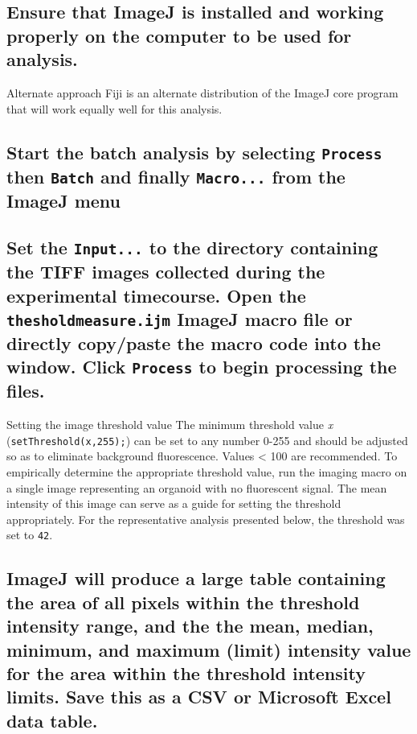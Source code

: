 \documentclass[11pt]{article}
\begin{document}
\subsection{{\sffamily } Ensure that ImageJ \supercite{Schneider:2012} is installed and working properly on the computer to be used for analysis.}
\label{sec:orgheadline84}

\begin{bclogo}[logo=\bcinfo, couleurBarre=Black, noborder=true, couleur=gray!10]{     Alternate approach}
Fiji \supercite{Schindelin:2012} is an alternate distribution of the ImageJ core program that will work equally well for this analysis.\\
\end{bclogo}

\subsection{{\sffamily } Start the batch analysis by selecting \texttt{Process} then \texttt{Batch} and finally \texttt{Macro...} from the ImageJ menu}
\label{sec:orgheadline85}
\subsection{{\sffamily } Set the \texttt{Input...} to the directory containing the TIFF images collected during the experimental timecourse. Open the \texttt{thesholdmeasure.ijm} ImageJ macro file or directly copy/paste the macro code into the window. Click \texttt{Process} to begin processing the files.}
\label{sec:orgheadline86}
\begin{bclogo}[logo=\bcinfo, couleurBarre=Black, noborder=true, couleur=gray!10]{     Setting the image threshold value}
The minimum threshold value \emph{x} (\texttt{setThreshold(x,255);}) can be set to any number 0-255 and should be adjusted so as to eliminate background fluorescence. Values < 100 are recommended. To empirically determine the appropriate threshold value, run the imaging macro on a single image representing an organoid with no fluorescent signal. The mean intensity of this image can serve as a guide for setting the threshold appropriately. For the representative analysis presented below, the threshold was set to \texttt{42}.\\
\end{bclogo}

\subsection{{\sffamily } ImageJ will produce a large table containing the area of all pixels within the threshold intensity range, and the the mean, median, minimum, and maximum (limit) intensity value for the area within the threshold intensity limits. Save this as a CSV or Microsoft Excel data table.}
\label{sec:orgheadline87}
\end{document}
